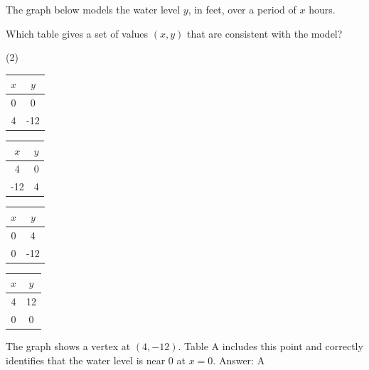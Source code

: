 \documentclass[11pt,paper=a4,answers]{exam}
\begin{document}
\begin{questions}
\question
The graph below models the water level $y$, in feet, over a period of $x$ hours. 
\begin{center}
\end{center}
Which table gives a set of values $(x, y)$ that are consistent with the model?
\begin{tasks}(2)
    \task \begin{tabular}{|c|c|} \hline $x$ & $y$ \\ \hline 0 & 0 \\ \hline 4 & -12 \\ \hline \end{tabular}
    \task \begin{tabular}{|c|c|} \hline $x$ & $y$ \\ \hline 4 & 0 \\ \hline -12 & 4 \\ \hline \end{tabular}
    \task \begin{tabular}{|c|c|} \hline $x$ & $y$ \\ \hline 0 & 4 \\ \hline 0 & -12 \\ \hline \end{tabular}
    \task \begin{tabular}{|c|c|} \hline $x$ & $y$ \\ \hline 4 & 12 \\ \hline 0 & 0 \\ \hline \end{tabular}
\end{tasks}

\begin{solution}
The graph shows a vertex at $(4, -12)$. Table A includes this point and correctly identifies that the water level is near 0 at $x=0$.
\vspace{5pt}
Answer: \colorbox{yellow!100}{A}
\end{solution}

\vspace{1cm}



\end{questions}
\end{document}
